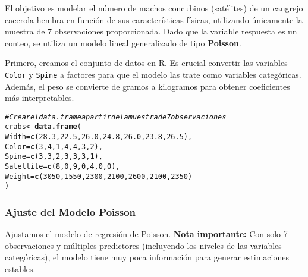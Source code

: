 \documentclass[paper=letter, fontsize=11pt]{scrartcl}\usepackage[]{graphicx}\usepackage[]{xcolor}
\makeatletter
\newcommand{\hlnum}[1]{\textcolor[rgb]{0.686,0.059,0.569}{#1}}%
\newcommand{\hlcom}[1]{\textcolor[rgb]{0.678,0.584,0.686}{\textit{#1}}}%
\newcommand{\hldef}[1]{\textcolor[rgb]{0.345,0.345,0.345}{#1}}%
\newcommand{\hlkwb}[1]{\textcolor[rgb]{0.69,0.353,0.396}{#1}}%
\newcommand{\hlkwc}[1]{\textcolor[rgb]{0.333,0.667,0.333}{#1}}%
\newcommand{\hlkwd}[1]{\textcolor[rgb]{0.737,0.353,0.396}{\textbf{#1}}}%
\newenvironment{kframe}{%
 \def\at@end@of@kframe{}%
 \ifinner\ifhmode%
  \def\at@end@of@kframe{\end{minipage}}%
  \begin{minipage}{\columnwidth}%
 \fi\fi%
 \def\FrameCommand##1{\hskip\@totalleftmargin \hskip-\fboxsep
 \colorbox{shadecolor}{##1}\hskip-\fboxsep
     \hskip-\linewidth \hskip-\@totalleftmargin \hskip\columnwidth}%
 \MakeFramed {\advance\hsize-\width
   \@totalleftmargin\z@ \linewidth\hsize
   \@setminipage}}%
 {\par\unskip\endMakeFramed%
 \at@end@of@kframe}
\newenvironment{knitrout}{}{} %
\numberwithin{equation}{problemcounter} %
\numberwithin{figure}{problemcounter} %
\numberwithin{table}{problemcounter} %
\numberwithin{subsection}{problemcounter}
\makeatother
\begin{document}
El objetivo es modelar el número de machos concubinos (satélites) de un cangrejo cacerola hembra en función de sus características físicas, utilizando únicamente la muestra de 7 observaciones proporcionada. Dado que la variable respuesta es un conteo, se utiliza un modelo lineal generalizado de tipo \textbf{Poisson}. 

Primero, creamos el conjunto de datos en R. Es crucial convertir las variables \texttt{Color} y \texttt{Spine} a factores para que el modelo las trate como variables categóricas. Además, el peso se convierte de gramos a kilogramos para obtener coeficientes más interpretables.

\begin{knitrout}
\color{fgcolor}\begin{kframe}
\begin{alltt}
\hlcom{# Crear el data.frame a partir de la muestra de 7 observaciones}
\hldef{crabs} \hlkwb{<-} \hlkwd{data.frame}\hldef{(}
  \hlkwc{Width} \hldef{=} \hlkwd{c}\hldef{(}\hlnum{28.3}\hldef{,} \hlnum{22.5}\hldef{,} \hlnum{26.0}\hldef{,} \hlnum{24.8}\hldef{,} \hlnum{26.0}\hldef{,} \hlnum{23.8}\hldef{,} \hlnum{26.5}\hldef{),}
  \hlkwc{Color} \hldef{=} \hlkwd{c}\hldef{(}\hlnum{3}\hldef{,} \hlnum{4}\hldef{,} \hlnum{1}\hldef{,} \hlnum{4}\hldef{,} \hlnum{4}\hldef{,} \hlnum{3}\hldef{,} \hlnum{2}\hldef{),}
  \hlkwc{Spine} \hldef{=} \hlkwd{c}\hldef{(}\hlnum{3}\hldef{,} \hlnum{3}\hldef{,} \hlnum{2}\hldef{,} \hlnum{3}\hldef{,} \hlnum{3}\hldef{,} \hlnum{3}\hldef{,} \hlnum{1}\hldef{),}
  \hlkwc{Satellite} \hldef{=} \hlkwd{c}\hldef{(}\hlnum{8}\hldef{,} \hlnum{0}\hldef{,} \hlnum{9}\hldef{,} \hlnum{0}\hldef{,} \hlnum{4}\hldef{,} \hlnum{0}\hldef{,} \hlnum{0}\hldef{),}
  \hlkwc{Weight} \hldef{=} \hlkwd{c}\hldef{(}\hlnum{3050}\hldef{,} \hlnum{1550}\hldef{,} \hlnum{2300}\hldef{,} \hlnum{2100}\hldef{,} \hlnum{2600}\hldef{,} \hlnum{2100}\hldef{,} \hlnum{2350}\hldef{)}
\hldef{)}
\end{alltt}
\end{kframe}
\end{knitrout}

\subsubsection*{Ajuste del Modelo Poisson}

Ajustamos el modelo de regresión de Poisson. \textbf{Nota importante:} Con solo 7 observaciones y múltiples predictores (incluyendo los niveles de las variables categóricas), el modelo tiene muy poca información para generar estimaciones estables.
\end{document}
